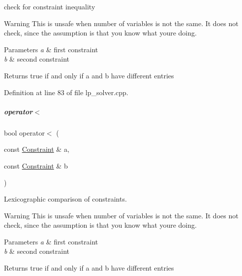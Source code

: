 check for constraint inequality 

\begin{DoxyWarning}{Warning}
This is unsafe when number of variables is not the same. It does not check, since the assumption is that you know what you\textquotesingle{}re doing. 
\end{DoxyWarning}

\begin{DoxyParams}{Parameters}
{\em a} & first constraint \\
\hline
{\em b} & second constraint \\
\hline
\end{DoxyParams}
\begin{DoxyReturn}{Returns}
{\ttfamily true} if and only if {\ttfamily a} and {\ttfamily b} have different entries 
\end{DoxyReturn}


Definition at line 83 of file lp\+\_\+solver.\+cpp.

\mbox{\label{group___c_l_s_solvers_ad7246226080bd15a0d477cd905b4b71c}} 
\subparagraph{\texorpdfstring{operator$<$}{operator<}}
{\footnotesize\ttfamily bool operator$<$ (\begin{DoxyParamCaption}\item[{const \hyperlink{group___c_l_s_solvers_class_l_p___solvers_1_1_constraint}{Constraint} \&}]{a,  }\item[{const \hyperlink{group___c_l_s_solvers_class_l_p___solvers_1_1_constraint}{Constraint} \&}]{b }\end{DoxyParamCaption})\hspace{0.3cm}{\ttfamily [friend]}}



Lexicographic comparison of constraints. 

\begin{DoxyWarning}{Warning}
This is unsafe when number of variables is not the same. It does not check, since the assumption is that you know what you\textquotesingle{}re doing. 
\end{DoxyWarning}

\begin{DoxyParams}{Parameters}
{\em a} & first constraint \\
\hline
{\em b} & second constraint \\
\hline
\end{DoxyParams}
\begin{DoxyReturn}{Returns}
{\ttfamily true} if and only if {\ttfamily a} and {\ttfamily b} have different entries 
\end{DoxyReturn}


